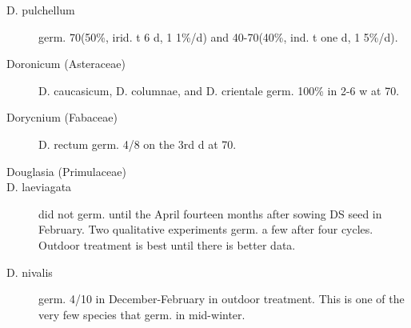\begin{description}
\item[D. pulchellum] germ. 70(50\%, irid. t 6 d, 1 1\%/d) and 40-70(40\%, ind. t one d,
1 5\%/d).

\item[Doronicum (Asteraceae)] D. caucasicum, D. columnae, and D. crientale
germ. 100\% in 2-6 w at 70.
\item[Dorycnium (Fabaceae)] D. rectum germ. 4/8 on the 3rd d at 70.

\item[Douglasia (Primulaceae)]
\item[D. laeviagata] did not germ. until the April fourteen months after sowing DS seed
in February. Two qualitative experiments germ. a few after four cycles. Outdoor
treatment is best until there is better data.
\item[D. nivalis] germ. 4/10 in December-February in outdoor treatment. This is one of
the very few species that germ. in mid-winter.


\end{description}
